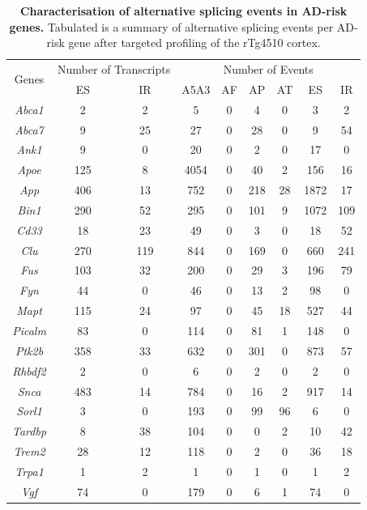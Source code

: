 \begin{table}[]
	\centering
	\captionsetup{width=0.95\textwidth}
	\caption[Characterisation of alternative splicing events in AD-risk genes]%
	{\textbf{Characterisation of alternative splicing events in AD-risk genes.} Tabulated is a summary of alternative splicing events per AD-risk gene after targeted profiling of the rTg4510 cortex.}
	\label{tab: merged_targeted_ASevents}
	\setlength\tabcolsep{9pt} %
	\begin{tabular}{@{}ccccccccc@{}}
		\toprule
		\multirow{2}{*}{Genes} & \multicolumn{2}{c}{Number of  Transcripts} & \multicolumn{6}{c}{Number of Events} \\ \cmidrule(l){2-9} 
		& ES  & IR  & A5A3 & AF & AP  & AT & ES   & IR  \\ \midrule
		\textit{Abca1}  & 2   & 2   & 5    & 0  & 4   & 0  & 3    & 2   \\
		\textit{Abca7}  & 9   & 25  & 27   & 0  & 28  & 0  & 9    & 54  \\
		\textit{Ank1}   & 9   & 0   & 20   & 0  & 2   & 0  & 17   & 0   \\
		\textit{Apoe}   & 125 & 8   & 4054 & 0  & 40  & 2  & 156  & 16  \\
		\textit{App}    & 406 & 13  & 752  & 0  & 218 & 28 & 1872 & 17  \\
		\textit{Bin1}   & 290 & 52  & 295  & 0  & 101 & 9  & 1072 & 109 \\
		\textit{Cd33}   & 18  & 23  & 49   & 0  & 3   & 0  & 18   & 52  \\
		\textit{Clu}    & 270 & 119 & 844  & 0  & 169 & 0  & 660  & 241 \\
		\textit{Fus}    & 103 & 32  & 200  & 0  & 29  & 3  & 196  & 79  \\
		\textit{Fyn}    & 44  & 0   & 46   & 0  & 13  & 2  & 98   & 0   \\
		\textit{Mapt}   & 115 & 24  & 97   & 0  & 45  & 18 & 527  & 44  \\
		\textit{Picalm} & 83  & 0   & 114  & 0  & 81  & 1  & 148  & 0   \\
		\textit{Ptk2b}  & 358 & 33  & 632  & 0  & 301 & 0  & 873  & 57  \\
		\textit{Rhbdf2} & 2   & 0   & 6    & 0  & 2   & 0  & 2    & 0   \\
		\textit{Snca}   & 483 & 14  & 784  & 0  & 16  & 2  & 917  & 14  \\
		\textit{Sorl1}  & 3   & 0   & 193  & 0  & 99  & 96 & 6    & 0   \\
		\textit{Tardbp} & 8   & 38  & 104  & 0  & 0   & 2  & 10   & 42  \\
		\textit{Trem2}  & 28  & 12  & 118  & 0  & 2   & 0  & 36   & 18  \\
		\textit{Trpa1}  & 1   & 2   & 1    & 0  & 1   & 0  & 1    & 2   \\
		\textit{Vgf}    & 74  & 0   & 179  & 0  & 6   & 1  & 74   & 0   \\ \bottomrule
	\end{tabular}
\end{table}

